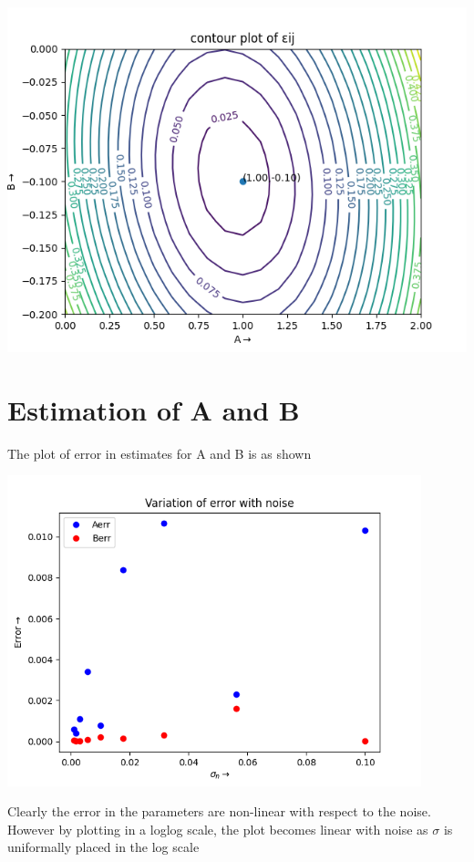 \documentclass[10pt,a4paper]{article}
\begin{document}
\includegraphics{figure_3.png}

\section{Estimation of A and B}

The plot of error in estimates for A and B is as shown

\includegraphics[width = 0.9\textwidth]{figure_4.png}

Clearly the error in the parameters are non-linear with respect to the noise. However by plotting in a loglog scale, the plot becomes linear with noise as $\sigma$ is uniformally placed in the log scale
\end{document}
